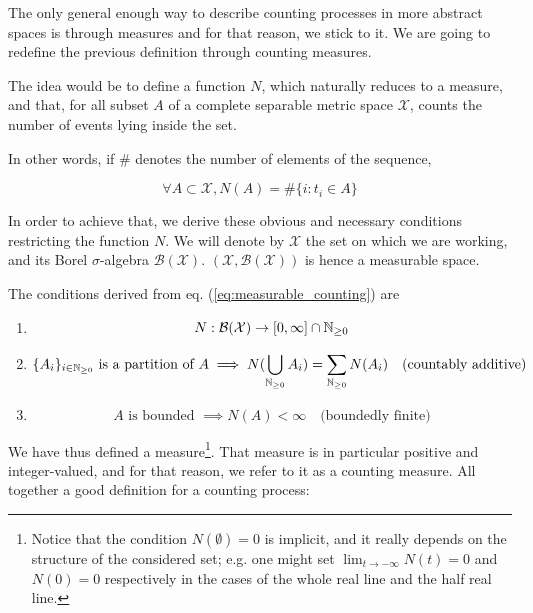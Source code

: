 The only general enough way to describe counting processes in more abstract spaces is through measures and for that reason, we stick to it. We are going to redefine the previous definition through counting measures.

The idea would be to define a function $N$, which naturally reduces to a measure, and that, for all subset $A$ of a complete separable metric space $\mathcal X$, counts the number of events lying inside the set.

In other words, if $\#$ denotes the number of elements of the sequence,

\begin{equation}
\forall A \subset \mathcal X, N(A) = \# \{ i: t_i \in A \}
\label{eq:measurable_counting}
\end{equation}

In order to achieve that, we derive these obvious and necessary conditions restricting the function $N$. We will denote by $\mathcal X$ the set on which we are working, and its Borel $\sigma$-algebra $\mathcal B( \mathcal X )$. $( \mathcal X, \mathcal B( \mathcal X ) )$ is hence a measurable space.

The conditions derived from eq. (\ref{eq:measurable_counting}) are
\begin{enumerate}
\setlength{\itemindent}{1 cm}
\item  
\begin{equation}
N : \mathcal B( \mathcal X ) \to [0, \infty ] \cap \mathbb{N}_{\geq 0}
\end{equation}
\item 
\begin{equation}
\{ A_i \}_{ i \in \mathbb{N}_{\geq 0}} \text{ is a partition of } A \implies N( \bigcup_{\mathbb{N}_{\geq 0}} A_i ) = \sum_{\mathbb{N}_{\geq 0}} N(A_i)  \quad \text{(countably additive)}
\end{equation}
\item 
\begin{equation}
A \text{ is bounded } \implies N(A) < \infty  \quad \text{(boundedly finite)}
\end{equation}
\end{enumerate}

We have thus defined a measure\footnote{Notice that the condition $N( \emptyset ) = 0$ is implicit, and it really depends on the structure of the considered set; e.g. one might set $\lim_{t\to -\infty} N(t) = 0$ and $N(0) = 0$ respectively in the cases of the whole real line and the half real line.}. That measure is in particular positive and integer-valued, and for that reason, we refer to it as a counting measure. All together a good definition for a counting process:

